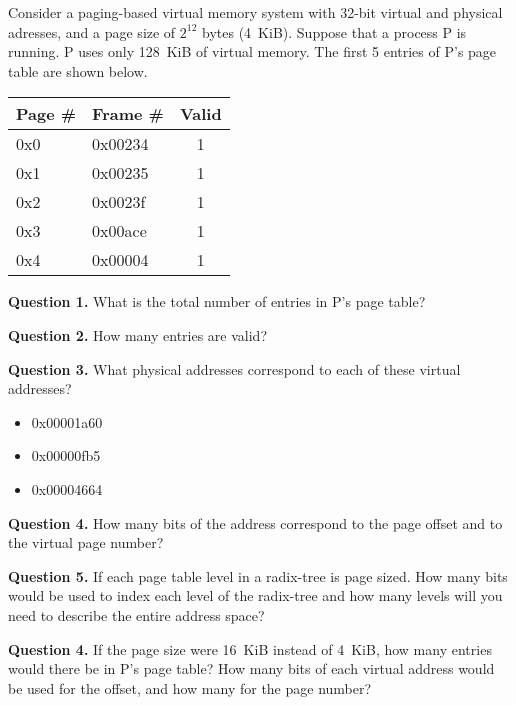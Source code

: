 \documentclass[letterpaper,twocolumn,10pt]{article}
\begin{document}
Consider a paging-based virtual memory system with 32-bit virtual and physical 
adresses, and a page size of $2^{12}$ bytes (4~KiB).  Suppose that a process P 
is running. P uses only 128~KiB of virtual memory.  The first 5 entries of P's 
page table are shown below.

\begin{table}
\centering
\begin{tabular}{l|l|c}
\toprule
Page \# & Frame \# & Valid \\
\midrule
0x0 & 0x00234 & 1\\
    0x1 & 0x00235 & 1\\
    0x2 & 0x0023f & 1\\
    0x3 & 0x00ace & 1\\
    0x4 & 0x00004 & 1\\
\bottomrule
\end{tabular}
\end{table}

\vspace{4em}

\noindent
\textbf{Question 1.} What is the total number of entries in P's page table?

\vspace{12em}

\noindent
\textbf{Question 2.} How many entries are valid?

\vspace{12em}

\textbf{Question 3.} What physical addresses correspond to each of these 
virtual addresses?

\begin{itemize}
\item 0x00001a60
\item 0x00000fb5
\item 0x00004664
\end{itemize}

\break

\textbf{Question 4.} How many bits of the address correspond to the page offset 
and to the virtual page number?

\vspace{14em}

\textbf{Question 5.} If each page table level in a radix-tree is page sized.  
How many bits would be used to index each level of the radix-tree and how many 
levels will you need to describe the entire address space?

\vspace{14em}

\textbf{Question 4.} If the page size were 16~KiB instead of 4~KiB, how many 
entries would there be in P's page table?  How many bits of each virtual 
address would be used for the offset, and how many for the page number?

\vspace{14em}
\end{document}
